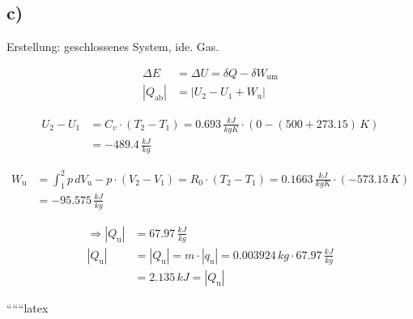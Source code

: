 

\subsection*{c)}

Erstellung: geschlossenes System, ide. Gas.

\begin{align*}
\Delta E & = \Delta U = \delta Q - \delta W_{\text{um}} \\
\left| Q_{\text{ab}} \right| & = \left| U_2 - U_1 + W_{\text{u}} \right|
\end{align*}

\begin{align*}
U_2 - U_1 & = C_v \cdot (T_2 - T_1) = 0.693 \, \frac{kJ}{kgK} \cdot (0 - (500 + 273.15) \, K) \\
& = -489.4 \, \frac{kJ}{kg}
\end{align*}

\begin{align*}
W_{\text{u}} & = \int_{1}^{2} p \, dV_{\text{u}} - p \cdot (V_2 - V_1) = R_0 \cdot (T_2 - T_1) = 0.1663 \, \frac{kJ}{kgK} \cdot (-573.15 \, K) \\
& = -95.575 \, \frac{kJ}{kg}
\end{align*}

\begin{align*}
\Rightarrow \left| Q_{\text{u}} \right| & = 67.97 \, \frac{kJ}{kg} \\
\left| Q_{\text{u}} \right| & = \left| Q_{\text{u}} \right| = m \cdot \left| q_{\text{u}} \right| = 0.003924 \, kg \cdot 67.97 \, \frac{kJ}{kg} \\
& = 2.135 \, kJ = \left| Q_{\text{u}} \right|
\end{align*}

``````latex